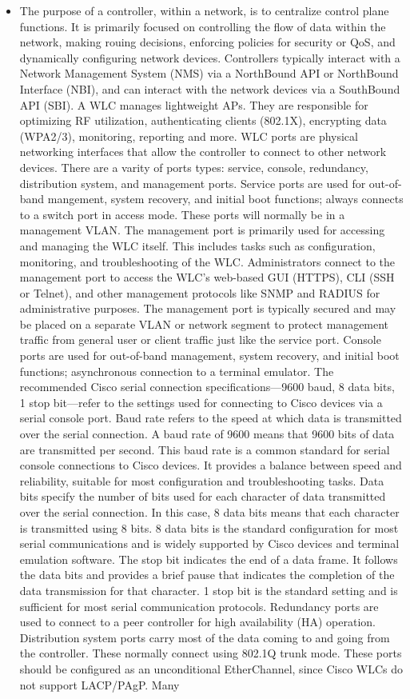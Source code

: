 \documentclass{article}
\begin{document}
\begin{itemize}
 	\item[] The purpose of a controller, within a network, is to centralize control plane functions. It is primarily focused on controlling the flow of data within the network, making rouing decisions, enforcing policies for security or QoS, and dynamically configuring network devices. Controllers typically interact with a Network Management System (NMS) via a NorthBound API or NorthBound Interface (NBI), and can interact with the network devices via a SouthBound API (SBI). A WLC manages lightweight APs. They are responsible for optimizing RF utilization, authenticating clients (802.1X), encrypting data (WPA2/3), monitoring, reporting and more. WLC ports are physical networking interfaces that allow the controller to connect to other network devices. There are a varity of ports types: service, console, redundancy, distribution system, and management ports. Service ports are used for out-of-band mangement, system recovery, and initial boot functions; always connects to a switch port in access mode. These ports will normally be in a management VLAN. The management port is primarily used for accessing and managing the WLC itself. This includes tasks such as configuration, monitoring, and troubleshooting of the WLC. Administrators connect to the management port to access the WLC's web-based GUI (HTTPS), CLI (SSH or Telnet), and other management protocols like SNMP and RADIUS for administrative purposes. The management port is typically secured and may be placed on a separate VLAN or network segment to protect management traffic from general user or client traffic just like the service port. Console ports are used for out-of-band management, system recovery, and initial boot functions; asynchronous connection to a terminal emulator. The recommended Cisco serial connection specifications—9600 baud, 8 data bits, 1 stop bit—refer to the settings used for connecting to Cisco devices via a serial console port. Baud rate refers to the speed at which data is transmitted over the serial connection. A baud rate of 9600 means that 9600 bits of data are transmitted per second. This baud rate is a common standard for serial console connections to Cisco devices. It provides a balance between speed and reliability, suitable for most configuration and troubleshooting tasks. Data bits specify the number of bits used for each character of data transmitted over the serial connection. In this case, 8 data bits means that each character is transmitted using 8 bits. 8 data bits is the standard configuration for most serial communications and is widely supported by Cisco devices and terminal emulation software. The stop bit indicates the end of a data frame. It follows the data bits and provides a brief pause that indicates the completion of the data transmission for that character. 1 stop bit is the standard setting and is sufficient for most serial communication protocols. Redundancy ports are used to connect to a peer controller for high availability (HA) operation. Distribution system ports carry most of the data coming to and going from the controller. These normally connect using 802.1Q trunk mode. These ports should be configured as an unconditional EtherChannel, since Cisco WLCs do not support LACP/PAgP. Many 
\end{itemize}
\end{document}
